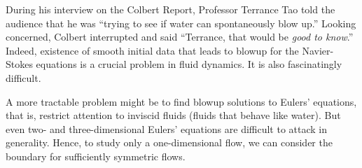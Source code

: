 \documentclass[12pt]{article}
\title{}
\begin{document}
%	 
%	


During his interview on the Colbert Report, Professor Terrance Tao told the audience that he was ``trying to see if water can spontaneously blow up.'' Looking concerned, Colbert interrupted and said ``Terrance, that would be \textit{good to know}.'' Indeed, existence of smooth initial data that leads to blowup for the Navier-Stokes equations is a crucial problem in fluid dynamics. It is also fascinatingly difficult.

A more tractable problem might be to find blowup solutions to Eulers' equations, that is, restrict attention to inviscid fluids (fluids that behave like water). But even two- and three-dimensional Eulers' equations are difficult to attack in generality. Hence, to study only a one-dimensional flow, we can consider the boundary for sufficiently symmetric flows.
\end{document}
